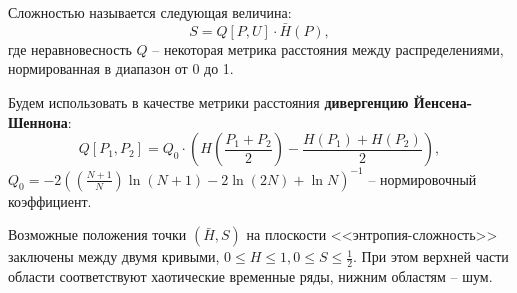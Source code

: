 \begin{definition}[Сложность]
    Сложностью называется следующая величина:
    \begin{equation*}
        S = Q\left[ P, U \right] \cdot \bar{H}\left( P \right),
    \end{equation*}
    где неравновесность $Q$ -- некоторая метрика расстояния между распределениями, нормированная в диапазон от 0 до 1.

    Будем использовать в качестве метрики расстояния \textbf{дивергенцию Йенсена-Шеннона}:
    \begin{equation*}
        Q\left[ P_1, P_2 \right] = Q_0 \cdot \left( H\left( \frac{P_1 + P_2}{2} \right) - \frac{H(P_1) + H(P_2)}{2} \right),
    \end{equation*}
    $Q_0 = -2\left( \left( \frac{N+1}{N} \right) \ln (N+1) - 2 \ln (2N) + \ln N \right)^{-1}$ -- нормировочный коэффициент.
\end{definition}

Возможные положения точки $(\bar{H}, S)$ на плоскости <<энтропия-сложность>> заключены между двумя кривыми, $0 \leq H \leq 1, 0 \leq S \leq \frac{1}{2}$. При этом верхней части области соответствуют хаотические временные ряды, нижним областям -- шум.
